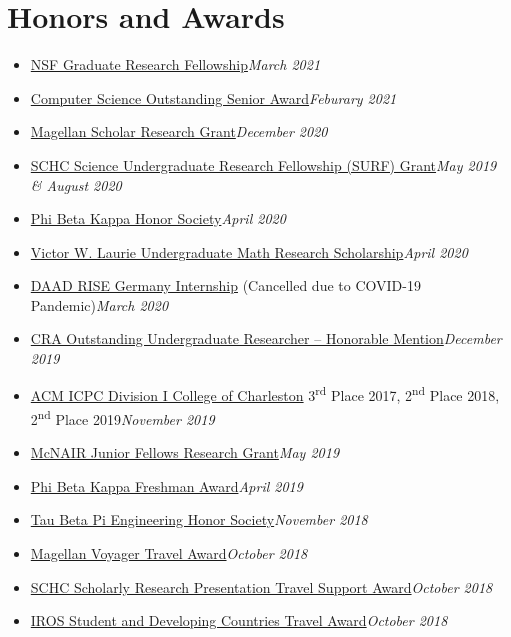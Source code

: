 \documentclass[\ifdefined\cv10pt\else11pt\fi,letterpaper]{moderncv}
\newcommand{\cvonly}[1]{\ifdefined\cv#1\fi\ignorespaces}
\renewcommand{\cvitem}[2]{\item {#1}\hfill\textit{#2}}
\newcommand{\nd}{\textsuperscript{nd}\xspace}
\newcommand{\rd}{\textsuperscript{rd}\xspace}
\let\oldsection\section
\renewcommand{\section}[1]{\vspace*{-1.3ex}\oldsection{#1}\vspace*{-0.5ex}}
\begin{document}
	\section{Honors and Awards}
	\begin{itemize}
		\cvitem{\href{https://www.research.gov/grfp/Login.do}{NSF Graduate Research Fellowship}}{March 2021}  %
		\cvitem{\href{https://cse.sc.edu/news/outstanding-senior-award-2021}{Computer Science Outstanding Senior Award}}{Feburary 2021}  %
		\cvitem{\href{https://sc.edu/about/offices_and_divisions/undergraduate_research/apply_for_funding/our_funding/magellan-scholar-award/index.php}{Magellan Scholar Research Grant}}{December 2020}
		\cvitem{\href{https://www.sc.edu/study/colleges_schools/honors_college/internal/beyond_the_classroom/undergraduate_research/surf_and_exploration_grants/index.php}{SCHC Science Undergraduate Research Fellowship (SURF) Grant}}{May 2019 \& August 2020}
		\cvitem{\href{https://www.pbk.org/}{Phi Beta Kappa Honor Society}}{April 2020}
		\cvitem{\href{https://sc.edu/study/colleges_schools/artsandsciences/mathematics/study/awards_scholarships/}{Victor W. Laurie Undergraduate Math Research Scholarship}}{April 2020}
		\cvitem{\href{https://www.daad.de/rise/en/rise-germany/}{DAAD RISE Germany Internship} (Cancelled due to COVID-19 Pandemic)}{March 2020}
		\cvitem{\href{https://cra.org/about/awards/outstanding-undergraduate-researcher-award/}{CRA Outstanding Undergraduate Researcher -- Honorable Mention}}{December 2019}  %
		\cvonly{\cvitem{\href{http://compsci.cofc.edu/ACM-ICPC.php}{ACM ICPC Division I College of Charleston} 3\rd Place 2017, 2\nd Place 2018, 2\nd Place 2019}{November 2019}}
		\cvitem{\href{https://sc.edu/about/offices_and_divisions/undergraduate_research/apply_for_funding/other_money_opportunities/cec_mcnair-research-fellows-summer/index.php}{McNAIR Junior Fellows Research Grant}}{May 2019}  %
		\cvitem{\href{https://www.sc.edu/uofsc/announcements/posts/2019/04/university_awards_day_2019.php}{Phi Beta Kappa Freshman Award}}{April 2019}
		\cvitem{\href{https://tbp.org/}{Tau Beta Pi Engineering Honor Society}}{November 2018}
		\cvonly{
			\cvitem{\href{https://www.sc.edu/about/offices_and_divisions/undergraduate_research/apply_for_funding/our_funding/conference-travel/index.php}{Magellan Voyager Travel Award}}{October 2018}
			\cvitem{\href{https://www.sc.edu/study/colleges_schools/honors_college/experience/undergraduate_research/index.php}{SCHC Scholarly Research Presentation Travel Support Award}}{October 2018}
			\cvitem{\href{https://www.iros2018.org/travel-grants}{IROS Student and Developing Countries Travel Award}}{October 2018}
}
\end{itemize}
\end{document}
